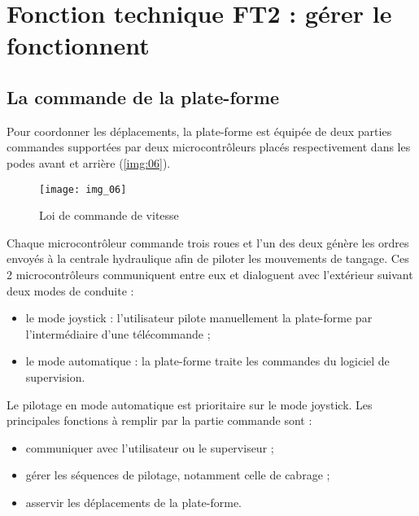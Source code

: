 \ifprof
\begin{corrige}
\end{corrige}
\else
\fi



\section{Fonction technique FT2 : gérer le fonctionnent}

\subsection{La commande de la plate-forme}

Pour coordonner les déplacements, la plate-forme est équipée de deux parties commandes supportées par deux microcontrôleurs placés respectivement dans les podes avant et arrière (\autoref{img:06}).

\begin{figure}[H]
\centering
\texttt{[image: img\_06]}
\caption{Loi de commande de vitesse \label{img:06}}
\end{figure}

Chaque microcontrôleur commande trois roues et l’un des deux génère les ordres envoyés à la centrale hydraulique afin de piloter les mouvements de tangage. Ces 2 microcontrôleurs communiquent entre eux et dialoguent avec l’extérieur suivant deux modes de conduite :
\begin{itemize}
\item le mode joystick : l’utilisateur pilote manuellement la plate-forme par l’intermédiaire d’une télécommande ;
\item le mode automatique : la plate-forme traite les commandes du logiciel de supervision.
\end{itemize}
Le pilotage en mode automatique est prioritaire sur le mode joystick. 
Les principales fonctions à remplir par la partie commande sont :
\begin{itemize}
\item communiquer avec l’utilisateur ou le superviseur ;
\item gérer les séquences de pilotage, notamment celle de cabrage ;
\item asservir les déplacements de la plate-forme.
\end{itemize}

